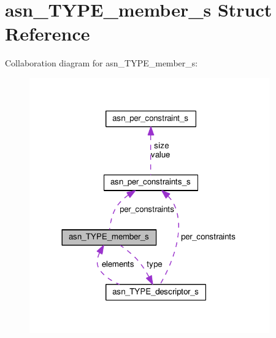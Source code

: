 \hypertarget{structasn__TYPE__member__s}{}\section{asn\+\_\+\+T\+Y\+P\+E\+\_\+member\+\_\+s Struct Reference}
\label{structasn__TYPE__member__s}


Collaboration diagram for asn\+\_\+\+T\+Y\+P\+E\+\_\+member\+\_\+s\+:\nopagebreak
\begin{figure}[H]
\begin{center}
\leavevmode
\includegraphics[width=293pt]{structasn__TYPE__member__s__coll__graph}
\end{center}
\end{figure}
